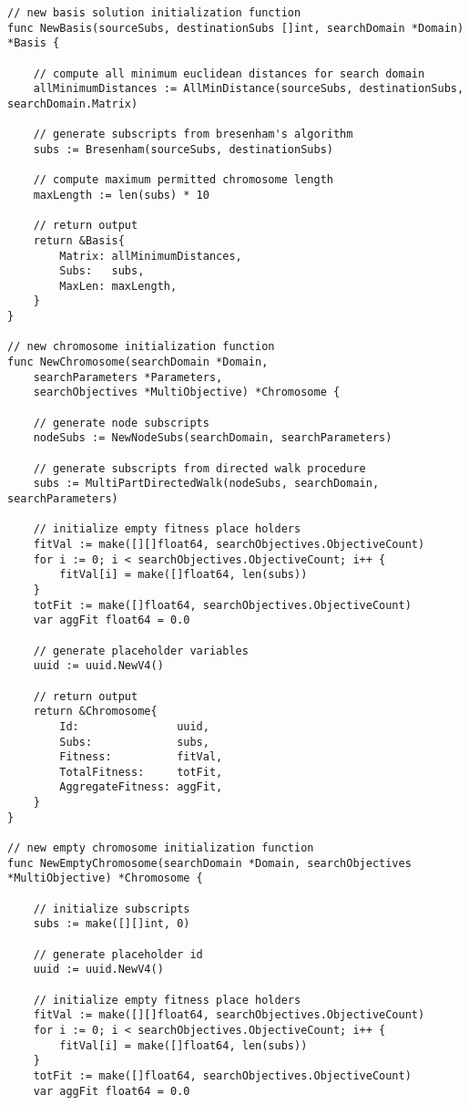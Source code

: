 \begin{lstlisting}[basicstyle=\tiny]
// new basis solution initialization function
func NewBasis(sourceSubs, destinationSubs []int, searchDomain *Domain) *Basis {

	// compute all minimum euclidean distances for search domain
	allMinimumDistances := AllMinDistance(sourceSubs, destinationSubs, searchDomain.Matrix)

	// generate subscripts from bresenham's algorithm
	subs := Bresenham(sourceSubs, destinationSubs)

	// compute maximum permitted chromosome length
	maxLength := len(subs) * 10

	// return output
	return &Basis{
		Matrix: allMinimumDistances,
		Subs:   subs,
		MaxLen: maxLength,
	}
}

// new chromosome initialization function
func NewChromosome(searchDomain *Domain, 
    searchParameters *Parameters, 
    searchObjectives *MultiObjective) *Chromosome {

	// generate node subscripts
	nodeSubs := NewNodeSubs(searchDomain, searchParameters)

	// generate subscripts from directed walk procedure
	subs := MultiPartDirectedWalk(nodeSubs, searchDomain, searchParameters)

	// initialize empty fitness place holders
	fitVal := make([][]float64, searchObjectives.ObjectiveCount)
	for i := 0; i < searchObjectives.ObjectiveCount; i++ {
		fitVal[i] = make([]float64, len(subs))
	}
	totFit := make([]float64, searchObjectives.ObjectiveCount)
	var aggFit float64 = 0.0

	// generate placeholder variables
	uuid := uuid.NewV4()

	// return output
	return &Chromosome{
		Id:               uuid,
		Subs:             subs,
		Fitness:          fitVal,
		TotalFitness:     totFit,
		AggregateFitness: aggFit,
	}
}

// new empty chromosome initialization function
func NewEmptyChromosome(searchDomain *Domain, searchObjectives *MultiObjective) *Chromosome {

	// initialize subscripts
	subs := make([][]int, 0)

	// generate placeholder id
	uuid := uuid.NewV4()

	// initialize empty fitness place holders
	fitVal := make([][]float64, searchObjectives.ObjectiveCount)
	for i := 0; i < searchObjectives.ObjectiveCount; i++ {
		fitVal[i] = make([]float64, len(subs))
	}
	totFit := make([]float64, searchObjectives.ObjectiveCount)
	var aggFit float64 = 0.0


\end{lstlisting}
